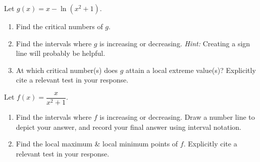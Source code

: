 \documentclass[10pt]{article}
\begin{document}


\example Let $g(x)=x-\ln(x^2+1)$.
%
\begin{enumerate}
\item[(a)] Find the critical numbers of $g$.


\item[(b)] Find the intervals where $g$ is increasing or decreasing. {\em Hint:} Creating a sign line will probably be helpful.



\item[(c)] At which critical number(s) does $g$ attain a local extreme value(s)? Explicitly cite a relevant test in your response.



\end{enumerate}

\newpage

\exercise Let $f(x)=\dfrac{x}{x^2+1}$.
\begin{enumerate}
\item[(a)]  Find the intervals where $f$ is increasing or decreasing. Draw a number line to depict your answer, and record your final answer using interval notation. \\


\item[(b)]  Find the local maximum \& local minimum points of $f$. Explicitly cite a relevant test in your response. \\


\end{enumerate}
\end{document}
